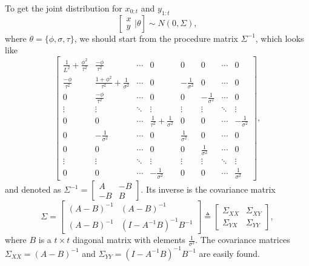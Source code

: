 To get the joint distribution for $x_{0:t}$ and $y_{1:t}$
\begin{equation*}
\left[ \begin{matrix} x\\y  \end{matrix}\bigg\rvert \theta \right]
\sim N\left(0, \Sigma  \right),
\end{equation*}
where $\theta = \{\phi,\sigma,\tau\}$, we should start from the procedure matrix $\Sigma^{-1}$, which looks like 
\begin{equation*}
\begin{bmatrix}
\frac{1}{L^2}+\frac{\phi^2}{\tau^2} & \frac{-\phi}{\tau^2} & \cdots & 0 & 0 & 0& \cdots & 0\\
\frac{-\phi}{\tau^2}   & \frac{1+\phi^2}{\tau^2}+\frac{1}{\sigma^2}& \cdots & 0 & -\frac{1}{\sigma^2} &0 & \cdots & 0 \\
0 & \frac{-\phi}{\tau^2}   &  \cdots & 0 & 0& -\frac{1}{\sigma^2} & \cdots & 0\\
\vdots & \vdots & \ddots & \vdots & \vdots & \vdots & \ddots & \vdots \\
0 & 0   &  \cdots & \frac{1}{\tau^2}+\frac{1}{\sigma^2} & 0 & 0 & \cdots &-\frac{1}{\sigma^2}\\
0 & -\frac{1}{\sigma^2}  & \cdots & 0 & \frac{1}{\sigma^2} & 0 & \cdots & 0 \\
0& 0 & \cdots & 0 & 0 &  \frac{1}{\sigma^2} & \cdots & 0\\
\vdots & \vdots & \ddots & \vdots & \vdots & \vdots & \ddots & \vdots\\
0 & 0& \cdots &-\frac{1}{\sigma^2} & 0 & 0 & \cdots &  \frac{1}{\sigma^2}
\end{bmatrix},
\end{equation*}
and denoted as $\Sigma^{-1}=\begin{bmatrix} A & -B \\ -B & B \end{bmatrix}$. Its inverse is the covariance matrix 
\begin{equation}
\Sigma=\begin{bmatrix} (A-B)^{-1} &  (A-B)^{-1} \\ (A-B)^{-1} & (I-A^{-1}B)^{-1}B^{-1} \end{bmatrix} \triangleq \begin{bmatrix}
\Sigma_{XX} & \Sigma_{XY}  \\ \Sigma_{YX} & \Sigma_{YY} 
\end{bmatrix},
\end{equation}
where $B$ is a $t\times t$ diagonal matrix with elements $\frac{1}{\sigma^2}$. The covariance matrices $\Sigma_{XX} =  (A-B)^{-1}$ and $\Sigma_{YY} =  (I-A^{-1}B)^{-1}B^{-1}$ are easily found. 



